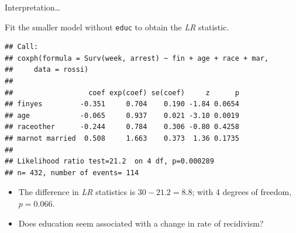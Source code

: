 \documentclass[ignorenonframetext,]{beamer}
\begin{document}
\begin{frame}[fragile]{%
\protect\hypertarget{interpretation-6}{%
Interpretation\ldots}}

Fit the smaller model without \texttt{educ} to obtain the \emph{LR}
statistic.

\footnotesize

\begin{verbatim}
## Call:
## coxph(formula = Surv(week, arrest) ~ fin + age + race + mar, 
##     data = rossi)
## 
##                  coef exp(coef) se(coef)     z      p
## finyes         -0.351     0.704    0.190 -1.84 0.0654
## age            -0.065     0.937    0.021 -3.10 0.0019
## raceother      -0.244     0.784    0.306 -0.80 0.4258
## marnot married  0.508     1.663    0.373  1.36 0.1735
## 
## Likelihood ratio test=21.2  on 4 df, p=0.000289
## n= 432, number of events= 114
\end{verbatim}

\normalsize

\begin{itemize}
\item
  The difference in \emph{LR} statistics is \(30 - 21.2 = 8.8\); with 4
  degrees of freedom, \(p = 0.066\).
\item
  Does education seem associated with a change in rate of recidivism?
\end{itemize}

\end{frame}
\end{document}
